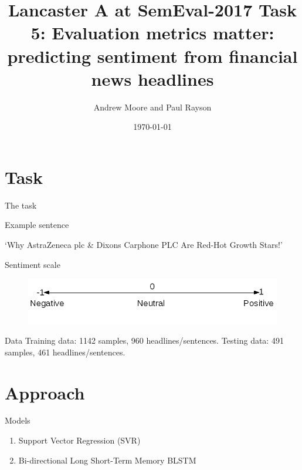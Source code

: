 \documentclass[10pt]{beamer}
\title{Lancaster A at SemEval-2017 Task 5: Evaluation metrics matter: predicting sentiment from financial news headlines}
\author{Andrew Moore and Paul Rayson}
\date{\today}
\institute{School of Computing and Communications, Lancaster University.}
\begin{document}
\maketitle

\section{Task}


\begin{frame}[fragile]{The task}
\begin{block}{Example sentence}
\begin{center}
`Why \alert{AstraZeneca plc} \& \alert{Dixons Carphone PLC} Are Red-Hot Growth Stars!'
\end{center}
\end{block}

\begin{block}{Sentiment scale}
\begin{figure}
    \includegraphics[scale=0.3]{sentiment_range.png}
  \end{figure}
\end{block}

\begin{block}{Data}
Training data: 1142 samples, 960 headlines/sentences.\newline
Testing data: 491 samples, 461 headlines/sentences.
\end{block}

\end{frame}


\section{Approach}

\begin{frame}{Models}
\begin{enumerate}
\item Support Vector Regression (SVR) \cite{drucker1997support}
\item Bi-directional Long Short-Term Memory BLSTM \cite{graves2005framewise}\cite{hochreiter1997long}
\end{enumerate}

\end{frame}
\end{document}
